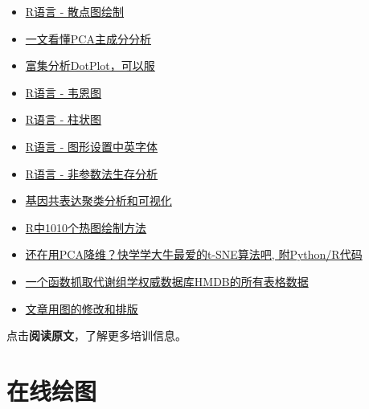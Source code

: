 \documentclass[]{article}
\numberwithin{figure}{section}
\numberwithin{table}{section}
\theoremstyle{definition}
\theoremstyle{definition}
\theoremstyle{definition}
\theoremstyle{remark}
\begin{document}
\begin{itemize}
{  - 富集分析泡泡图 （文末有彩蛋）}
\item
  \href{http://mp.weixin.qq.com/s?__biz=MzI5MTcwNjA4NQ==\&mid=2247484056\&idx=1\&sn=f9b2b4f7495b432e9294b7cbf42eaf33\&chksm=ec0dc712db7a4e04769d322558364b4b401b0a8153097c7252e83170e9201a31c2a7abbaf101\#rd}{R语言
  - 散点图绘制}
\item
  \href{http://mp.weixin.qq.com/s?__biz=MzI5MTcwNjA4NQ==\&mid=2247484036\&idx=1\&sn=22ee356d0c9680d56dada1b777985ed2\&chksm=ec0dc70edb7a4e182a21475e9ddcde35b907c291549cc8c2e767be260af445ff5455aa358b04\#rd}{一文看懂PCA主成分分析}
\item
  \href{http://mp.weixin.qq.com/s?__biz=MzI5MTcwNjA4NQ==\&mid=2247484063\&idx=1\&sn=f4e93d428e4910b4abbee9c0430cd170\&chksm=ec0dc715db7a4e0318b388ba2ab3d51677741421c42ada474a0ac6046a0699283014eae84b6f\#rd}{富集分析DotPlot，可以服}
\item
  \href{http://mp.weixin.qq.com/s?__biz=MzI5MTcwNjA4NQ==\&mid=2247484076\&idx=1\&sn=fa5af19a2a4db4b0c5c7f145bf93ca57\&chksm=ec0dc726db7a4e30fe7a0492ed9ea8eb5fa1c34641b1442a2da003efde0546b30c48fde3f118\#rd}{R语言
  - 韦恩图}
\item
  \href{http://mp.weixin.qq.com/s?__biz=MzI5MTcwNjA4NQ==\&mid=2247484134\&idx=1\&sn=ffb41298eae74834af2f5dad05d37921\&chksm=ec0dc76cdb7a4e7a852ac0670532c12c690399f140a2335f640eaf01f7da26bc5480941686a9\#rd}{R语言
  - 柱状图}
\item
  \href{http://mp.weixin.qq.com/s/NAwyvtTS7t5rRU7KKBwHTA}{R语言 -
  图形设置中英字体}
\item
  \href{http://mp.weixin.qq.com/s/_Dy9Yn8fc8I0rASGxH5x9A}{R语言 -
  非参数法生存分析}
\item
  \href{http://mp.weixin.qq.com/s/ST2SAmfKOptpJOHS8podmQ}{基因共表达聚类分析和可视化}
\item
  \href{http://mp.weixin.qq.com/s/N7oLvJ1oPIImgybJVVSxXg}{R中1010个热图绘制方法}
\item
  \href{http://mp.weixin.qq.com/s/alBfj3Y08qCnZoz5JwVdaw}{还在用PCA降维？快学学大牛最爱的t-SNE算法吧,
  附Python/R代码}
\item
  \href{http://mp.weixin.qq.com/s/rYjcsfHrbcAhaFpQI5Yc6g}{一个函数抓取代谢组学权威数据库HMDB的所有表格数据}
\item
  \href{https://mp.weixin.qq.com/s/IJNyhinakY0lSXgCN7b9ug}{文章用图的修改和排版}
\end{itemize}

点击\textbf{阅读原文}，了解更多培训信息。

\section{在线绘图}\label{imagegp}
\end{document}
